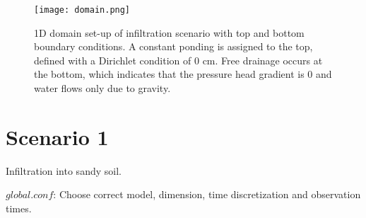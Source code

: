 \documentclass[
10pt, %
a4paper, %
oneside, %
headinclude,footinclude, %
BCOR5mm, %
]{scrartcl}
\begin{document}
\begin{figure}[!h]
\centering
\texttt{[image: domain.png]}
\caption{1D domain set-up of infiltration scenario with top and bottom boundary conditions. A constant ponding is assigned to the top, defined with a Dirichlet condition of 0 cm. Free drainage occurs at the bottom, which indicates that the pressure head gradient is 0 and water flows only due to gravity.}
\end{figure}

\newpage

\section*{Scenario 1}

Infiltration into sandy soil. 

$global.conf$: Choose correct model, dimension, time discretization and observation times.
\end{document}
